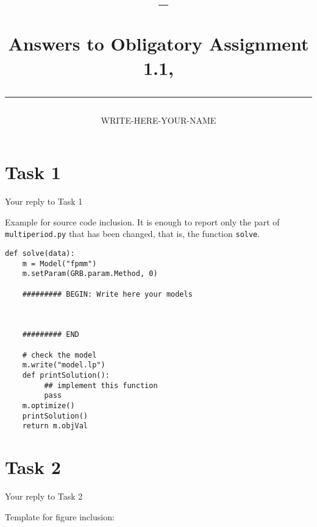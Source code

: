 \documentclass[a4paper,10pt]{article}
\title{\begin{flushleft}
\vspace{-4ex}
\courseid~-- \coursename \\[0.2cm]
{\Large Answers to Obligatory Assignment 1.1, \term \\[3ex]
\hrule}
\end{flushleft}
}
\date{}
\author{WRITE-HERE-YOUR-NAME}
\begin{document}
\maketitle

\section*{Task 1}



Your reply to Task 1


Example for source code inclusion. It is enough to report only the part
of \verb=multiperiod.py= that has been changed, that is, the function
\verb=solve=.

\begin{lstlisting}
def solve(data):
    m = Model("fpmm")
    m.setParam(GRB.param.Method, 0)
    
    ######### BEGIN: Write here your models
    
    
    
    ######### END
     
    # check the model
    m.write("model.lp")
    def printSolution():
         ## implement this function
         pass
    m.optimize()
    printSolution()
    return m.objVal

\end{lstlisting}


\newpage
\section*{Task 2}


Your reply to Task 2


Template for figure inclusion:

\begin{figure}[htb]
\begin{center}
\end{center}
\end{figure}

\newpage
\end{document}
